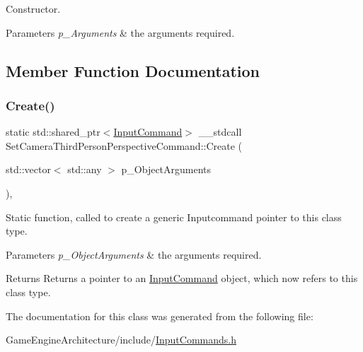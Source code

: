 Constructor. 


\begin{DoxyParams}{Parameters}
{\em p\+\_\+\+Arguments} & the arguments required. \\
\hline
\end{DoxyParams}


\subsection{Member Function Documentation}
\mbox{\label{class_set_camera_third_person_perspective_command_a5fddf3048c322ace2bb78a63318aa10f}} 
\subsubsection{\texorpdfstring{Create()}{Create()}}
{\footnotesize\ttfamily static std\+::shared\+\_\+ptr$<$\mbox{\hyperlink{class_input_command}{Input\+Command}}$>$ \+\_\+\+\_\+stdcall Set\+Camera\+Third\+Person\+Perspective\+Command\+::\+Create (\begin{DoxyParamCaption}\item[{std\+::vector$<$ std\+::any $>$}]{p\+\_\+\+Object\+Arguments }\end{DoxyParamCaption})\hspace{0.3cm}{\ttfamily [inline]}, {\ttfamily [static]}}



Static function, called to create a generic Inputcommand pointer to this class type. 


\begin{DoxyParams}{Parameters}
{\em p\+\_\+\+Object\+Arguments} & the arguments required. \\
\hline
\end{DoxyParams}
\begin{DoxyReturn}{Returns}
Returns a pointer to an \mbox{\hyperlink{class_input_command}{Input\+Command}} object, which now refers to this class type. 
\end{DoxyReturn}


The documentation for this class was generated from the following file\+:\begin{DoxyCompactItemize}
\item 
Game\+Engine\+Architecture/include/\mbox{\hyperlink{_input_commands_8h}{Input\+Commands.\+h}}\end{DoxyCompactItemize}
